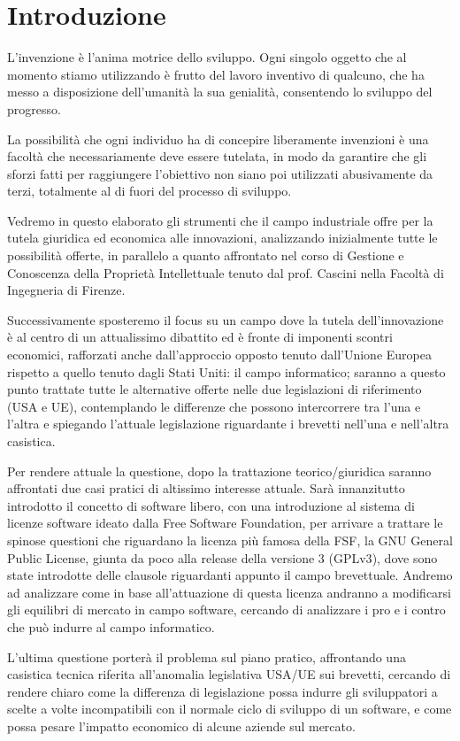  \chapter{Introduzione}
L'invenzione è l'anima motrice dello sviluppo. Ogni singolo oggetto che al momento stiamo utilizzando è frutto del lavoro inventivo di qualcuno, che ha messo a disposizione dell'umanità la sua genialità, consentendo lo sviluppo del progresso. 

La possibilità che ogni individuo ha di concepire liberamente invenzioni è una facoltà che necessariamente deve essere tutelata, in modo da garantire che gli sforzi fatti per raggiungere l'obiettivo non siano poi utilizzati abusivamente da terzi, totalmente al di fuori del processo di sviluppo. 

Vedremo in questo elaborato gli strumenti che il campo industriale offre per la tutela giuridica ed economica alle innovazioni, analizzando inizialmente tutte le possibilità offerte, in parallelo a quanto affrontato nel corso di Gestione e Conoscenza della Proprietà Intellettuale tenuto dal prof. Cascini nella Facoltà di Ingegneria di Firenze. 

Successivamente sposteremo il focus su un campo dove la tutela dell'innovazione è al centro di un attualissimo dibattito ed è fronte di imponenti scontri economici, rafforzati anche dall'approccio opposto tenuto dall'Unione Europea rispetto a quello tenuto dagli Stati Uniti: il campo informatico;  saranno a questo punto trattate tutte le alternative offerte nelle due legislazioni di riferimento (USA e UE), contemplando le differenze che possono intercorrere tra l'una e l'altra e spiegando l'attuale legislazione riguardante i brevetti nell'una e nell'altra casistica.

Per rendere attuale la questione, dopo la trattazione teorico/giuridica saranno affrontati due casi pratici di altissimo interesse attuale. 
Sarà innanzitutto introdotto il concetto di software libero, con una introduzione al sistema di licenze software ideato dalla Free Software Foundation, per arrivare a trattare le spinose questioni che riguardano la licenza più famosa della FSF, la GNU General Public License, giunta da poco alla release della versione 3 (GPLv3\cite{gpl}), dove sono state introdotte delle clausole riguardanti appunto il campo brevettuale. Andremo ad analizzare come in base all'attuazione di questa licenza andranno a modificarsi gli equilibri di mercato in campo software, cercando di analizzare i pro e i contro che può indurre al campo informatico.

L'ultima questione porterà il problema sul piano pratico, affrontando una casistica tecnica riferita all'anomalia legislativa USA/UE sui brevetti, cercando di rendere chiaro come la differenza di legislazione possa indurre gli sviluppatori a scelte a volte incompatibili con il normale ciclo di sviluppo di un software, e come possa pesare l'impatto economico di alcune aziende sul mercato.
